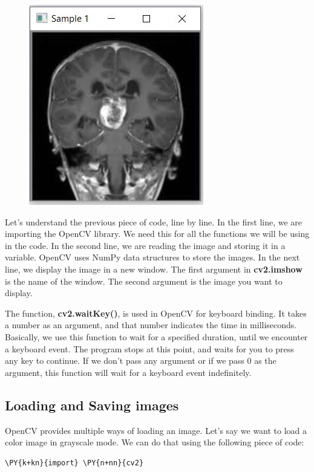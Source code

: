 \begin{figure}[htbp]
	\centering \includegraphics[width=0.45\columnwidth]{./figures/p1.jpg}
\end{figure}

Let's understand the previous piece of code, line by line. In the first line, we are importing the OpenCV 	library. We need this for all the functions we will be using in the code. In the second line, we are reading the image 	and storing it in a variable. OpenCV uses NumPy data structures to store the images. In the next line, we display the 	image in a new window. The first argument in \textbf{cv2.imshow} is the name of the window. The second argument is the 	image you want to display.

The function, \textbf{cv2.waitKey()}, is used in OpenCV for keyboard binding. It takes a number as an argument, and 	that number indicates the time in milliseconds. Basically, we use this function to wait for a specified duration, until we 	encounter a keyboard event. The program stops at this point, and waits for you to press any key to continue. If we 	don't pass any argument or if we pass 0 as the argument, this function will wait for a keyboard event indefinitely.

\subsection{Loading and Saving images}
OpenCV provides multiple ways of loading an image. Let's say we want to load a color image in grayscale mode. We can do that using the following piece of code:

\vspace{0.5cm}

\begin{tcolorbox}[breakable, size=fbox, boxrule=1pt, pad at break*=1mm,colback=cellbackground, colframe=cellborder]
	\begin{Verbatim}[commandchars=\\\{\}]
\PY{k+kn}{import} \PY{n+nn}{cv2}
	\end{Verbatim}
\end{tcolorbox}

